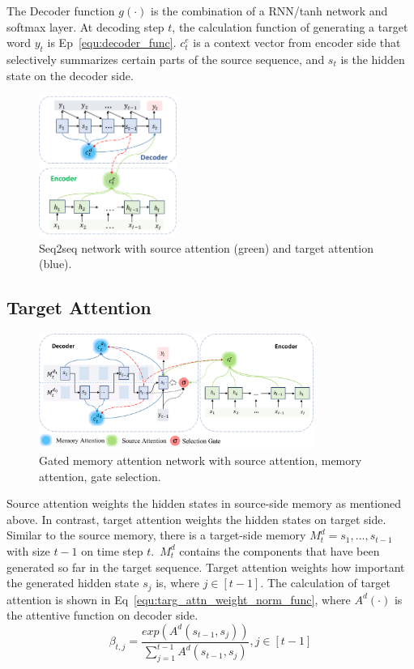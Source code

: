 \documentclass[letterpaper]{article} %
\begin{document}
The Decoder function $g(\cdot)$ is the combination of a RNN/tanh network and softmax layer. 
At decoding step $t$, the calculation function of generating a target word $y_t$ is Ep~\eqref{equ:decoder_func}. $c_t^e$ is a context vector from encoder side that selectively summarizes certain parts of the source sequence, and $s_t$ is the hidden state on the decoder side.


\begin{figure}[t]
\centering
\includegraphics[width=0.40\textwidth]{attn.pdf}
\caption{Seq2seq network with source attention (green) and target attention (blue).}
\label{Fig:ertgsystem}
\end{figure}

\subsection{Target Attention}

\begin{figure}[t]
\centering
\includegraphics[width=0.8\textwidth]{v15.pdf}
\caption{Gated memory attention network with source attention, memory attention, gate selection.}
\label{Fig:ertgsystem}
\end{figure}


Source attention weights the hidden states in source-side memory as mentioned above. 
In contrast, target attention \cite{xia2017sequence} weights the hidden states on target side.
 Similar to the source memory, there is a target-side memory $M^{d}_t={s_1,...,s_{t-1}}$ with size $t-1$ on time step $t$.\
 $M^{d}_t$ contains the components that have been generated so far in the target sequence.
 Target attention weights how important the generated hidden state $s_j$ is, where $j\in [t-1]$.
 The calculation of target attention is shown in Eq~\eqref{equ:targ_attn_weight_norm_func}, where $A^d(\cdot)$ is the attentive function on decoder side. 
\begin{equation}
\label{equ:targ_attn_weight_norm_func}
\beta_{t,j}=\frac{exp(A^d(s_{t-1},s_{j}))}{\sum_{j=1}^{t-1} A^d(s_{t-1},s_{j})}, j\in [t-1]
\end{equation}
\end{document}

